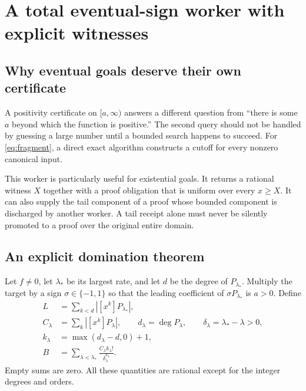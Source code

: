 \section{A total eventual-sign worker with explicit witnesses}
\label{sec:tails}

\subsection{Why eventual goals deserve their own certificate}

A positivity certificate on $[a,\infty)$ answers a different question from
``there is some $a$ beyond which the function is positive.'' The second query
should not be handled by guessing a large number until a bounded search happens
to succeed. For \eqref{eq:fragment}, a direct exact algorithm constructs a
cutoff for every nonzero canonical input.

This worker is particularly useful for existential goals. It returns a rational
witness $X$ together with a proof obligation that is uniform over every
$x\ge X$. It can also supply the tail component of a proof whose bounded
component is discharged by another worker. A tail receipt alone must never be
silently promoted to a proof over the original entire domain.

\subsection{An explicit domination theorem}

Let $f\ne0$, let $\lambda_*$ be its largest rate, and let $d$ be the degree of
$P_{\lambda_*}$. Multiply the target by a sign $\sigma\in\{-1,1\}$ so that the
leading coefficient of $\sigma P_{\lambda_*}$ is $a>0$. Define
\begin{align*}
 L&=\sum_{k<d}|[x^k]P_{\lambda_*}|,\\
 C_\lambda&=\sum_k|[x^k]P_\lambda|,\qquad
 d_\lambda=\deg P_\lambda,\qquad
 \delta_\lambda=\lambda_*-\lambda>0,\\
 k_\lambda&=\max(d_\lambda-d,0)+1,\\
 B&=\sum_{\lambda<\lambda_*}
       \frac{C_\lambda k_\lambda!}{\delta_\lambda^{k_\lambda}}.
\end{align*}
Empty sums are zero. All these quantities are rational except for the integer
degrees and orders.

